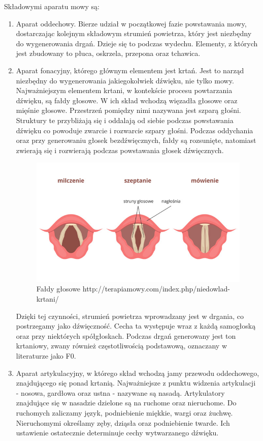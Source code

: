 \documentclass[a4paper,12 pt]{article}
\begin{document}
Składowymi aparatu mowy są:
\begin{enumerate}
\item Aparat oddechowy. Bierze udział w początkowej fazie powstawania mowy, dostarczając kolejnym składowym strumień powietrza, który jest niezbędny do wygenerowania drgań. Dzieje się to podczas wydechu. Elementy, z których jest zbudowany to płuca, oskrzela, przepona oraz tchawica.

\item Aparat fonacyjny, którego głównym elementem jest krtań. Jest to narząd niezbędny do wygenerowania jakiegokolwiek dźwięku, nie tylko mowy. Najważniejszym elementem krtani, w kontekście procesu powtarzania dźwięku, są fałdy głosowe. W ich skład wchodzą więzadła głosowe oraz mięśnie głosowe. Przestrzeń pomiędzy nimi nazywana jest szparą głośni. Struktury te przybliżają się i oddalają od siebie podczas powstawania dźwięku co powoduje zwarcie i rozwarcie szpary głośni. Podczas oddychania oraz przy generowaniu głosek bezdźwięcznych, fałdy są rozsunięte, natomiast zwierają się  i rozwierają podczas powstawania głosek dźwięcznych. 

\begin{figure}[!htbp]

\centering
\includegraphics[scale=0.5]{faldy_glosowe}
\caption{Fałdy głosowe http://terapiamowy.com/index.php/niedowlad-krtani/}

\end{figure}
\FloatBarrier

Dzięki tej czynności, strumień powietrza wprowadzany jest w drgania, co postrzegamy jako dźwięczność. Cecha ta występuje wraz z każdą samogłoską oraz przy niektórych spółgłoskach. Podczas drgań generowany jest ton krtaniowy, zwany również częstotliwością podstawową, oznaczany w literaturze jako F0. 
\item Aparat artykulacyjny, w którego skład wchodzą jamy przewodu oddechowego, znajdującego się ponad krtanią. Najważniejsze z punktu widzenia artykulacji - nosowa, gardłowa oraz ustna - nazywane są nasadą. Artykulatory znajdujące się w nasadzie dzielone są na ruchome oraz nieruchome. Do ruchomych zaliczamy język, podniebienie miękkie, wargi oraz żuchwę. Nieruchomymi określamy zęby, dziąsła oraz podniebienie twarde. Ich ustawienie ostatecznie determinuje cechy wytwarzanego dźwięku. 
\end{enumerate}
\end{document}

